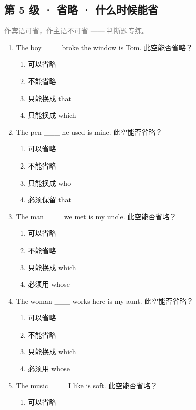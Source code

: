 \documentclass[11pt,a4paper]{ctexart}
\begin{document}
\subsection*{第 5 级 · 省略 · 什么时候能省}
\noindent\textcolor{gray}{作宾语可省，作主语不可省 —— 判断题专练。}\par\smallskip
\begin{enumerate}[leftmargin=*,itemsep=4pt]
\item The boy \_\_\_ broke the window is Tom. 此空能否省略？
\begin{enumerate}[label=\Alph*.,leftmargin=2em,itemsep=1pt,topsep=2pt]
\item 可以省略
\item 不能省略
\item 只能换成 that
\item 只能换成 which
\end{enumerate}
\item The pen \_\_\_ he used is mine. 此空能否省略？
\begin{enumerate}[label=\Alph*.,leftmargin=2em,itemsep=1pt,topsep=2pt]
\item 可以省略
\item 不能省略
\item 只能换成 who
\item 必须保留 that
\end{enumerate}
\item The man \_\_\_ we met is my uncle. 此空能否省略？
\begin{enumerate}[label=\Alph*.,leftmargin=2em,itemsep=1pt,topsep=2pt]
\item 可以省略
\item 不能省略
\item 只能换成 which
\item 必须用 whose
\end{enumerate}
\item The woman \_\_\_ works here is my aunt. 此空能否省略？
\begin{enumerate}[label=\Alph*.,leftmargin=2em,itemsep=1pt,topsep=2pt]
\item 可以省略
\item 不能省略
\item 只能换成 which
\item 必须用 whose
\end{enumerate}
\item The music \_\_\_ I like is soft. 此空能否省略？
\begin{enumerate}[label=\Alph*.,leftmargin=2em,itemsep=1pt,topsep=2pt]
\item 可以省略

\end{enumerate}
\end{enumerate}
\end{document}
